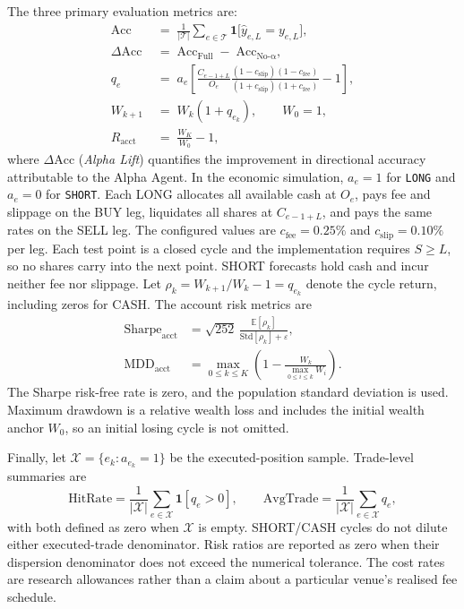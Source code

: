 The three primary evaluation metrics are:
\begin{align}
    \mathrm{Acc}
    &\;=\;
    \frac{1}{|\mathcal{T}|}
    \sum_{e \in \mathcal{T}}
    \mathbf{1}\!\bigl[\hat{y}_{e,L} = y_{e,L}\bigr],
    \label{eq:acc} \\[4pt]
    \Delta\mathrm{Acc}
    &\;=\;
    \mathrm{Acc}_{\mathrm{Full}}
    \;-\; \mathrm{Acc}_{\mathrm{No\text{-}\alpha}},
    \label{eq:lift} \\[4pt]
    q_e
    &\;=\;
    a_e\left[
    \frac{C_{e-1+L}}{O_e}
    \frac{(1-c_{\mathrm{slip}})(1-c_{\mathrm{fee}})}
         {(1+c_{\mathrm{slip}})(1+c_{\mathrm{fee}})}-1
    \right],
    \label{eq:execution_return}\\[4pt]
    W_{k+1}
    &\;=\;
    W_k\left(1+q_{e_k}\right),\qquad W_0=1,
    \label{eq:wealth_update}\\[4pt]
    R_{\mathrm{acct}}
    &\;=\;
    \frac{W_K}{W_0}-1,
    \label{eq:account_return}
\end{align}
where $\Delta\mathrm{Acc}$ (\emph{Alpha Lift}) quantifies the improvement
in directional accuracy attributable to the Alpha Agent. In the economic
simulation, $a_e=1$ for \texttt{LONG} and $a_e=0$ for \texttt{SHORT}. Each
LONG allocates all available cash at $O_e$, pays fee and slippage on the BUY
leg, liquidates all shares at $C_{e-1+L}$, and pays the same rates on the SELL
leg. The configured values are $c_{\mathrm{fee}}=0.25\%$ and
$c_{\mathrm{slip}}=0.10\%$ per leg. Each test point is a closed cycle and the
implementation requires $S\geq L$, so no shares carry into the next point.
SHORT forecasts hold cash and incur neither fee nor slippage. Let
$\rho_k=W_{k+1}/W_k-1=q_{e_k}$ denote the cycle return, including zeros for
CASH. The account risk metrics are
\begin{align}
    \mathrm{Sharpe}_{\mathrm{acct}}
    &=\sqrt{252}\,\frac{\mathbb{E}[\rho_k]}
    {\mathrm{Std}[\rho_k]+\varepsilon},
    \label{eq:account_sharpe}\\[4pt]
    \mathrm{MDD}_{\mathrm{acct}}
    &=\max_{0\leq k\leq K}
      \left(1-\frac{W_k}{\max_{0\leq i\leq k}W_i}\right).
    \label{eq:account_mdd}
\end{align}
The Sharpe risk-free rate is zero, and the population standard deviation is
used. Maximum drawdown is a relative wealth loss and includes the initial
wealth anchor $W_0$, so an initial losing cycle is not omitted.

Finally, let $\mathcal{X}=\{e_k:a_{e_k}=1\}$ be the executed-position sample.
Trade-level summaries are
\begin{equation}
    \mathrm{HitRate}=\frac{1}{|\mathcal{X}|}
    \sum_{e\in\mathcal{X}}\mathbf{1}[q_e>0],\qquad
    \mathrm{AvgTrade}=\frac{1}{|\mathcal{X}|}
    \sum_{e\in\mathcal{X}}q_e,
    \label{eq:account_trade_metrics}
\end{equation}
with both defined as zero when $\mathcal{X}$ is empty. SHORT/CASH cycles do not
dilute either executed-trade denominator. Risk ratios are reported as zero when
their dispersion denominator does not exceed the numerical tolerance. The
cost rates are research allowances rather than a claim about a particular
venue's realised fee schedule.
